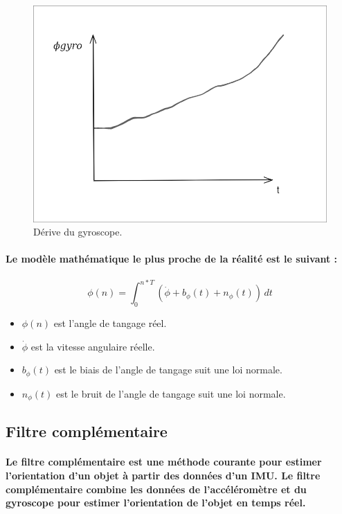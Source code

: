 \paragraph*{}
\begin{figure}[!htpb]
	\centering
	\includegraphics[width=0.7\linewidth]{Figures/drift.png}
	\caption[Dérive du gyroscope]{Dérive du gyroscope.}
\end{figure}

\paragraph{Le modèle mathématique le plus proche de la réalité est le suivant :}

\begin{equation}
	\phi(n) = \int_{0}^{n*T} (\dot{\phi} + b_{\phi}(t) + n_{\phi}(t)) \,dt
\end{equation}

\begin{itemize}
	\item $\phi(n)$ est l'angle de tangage réel.
	\item $\dot{\phi}$ est la vitesse angulaire réelle.
	\item $b_{\phi}(t)$ est le biais de l'angle de tangage suit une loi normale.
	\item $n_{\phi}(t)$ est le bruit de l'angle de tangage suit une loi normale.
\end{itemize}


\subsection{Filtre complémentaire}

\paragraph{Le filtre complémentaire est une méthode courante pour estimer l'orientation d'un objet à partir des données d'un IMU. Le filtre complémentaire combine les données de l'accéléromètre et du gyroscope pour estimer l'orientation de l'objet en temps réel.}

